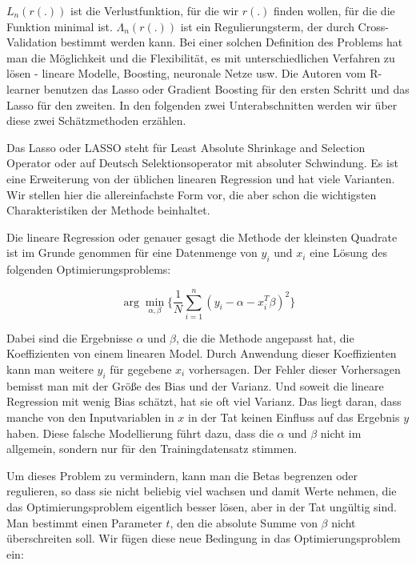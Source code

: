 \documentclass[12pt,a4paper,twoside]{scrartcl}
\numberwithin{equation}{section}
\newcounter{subsubsubsection}[subsubsection]
\begin{document}
\noindent
$L_n(r(.))$ ist die Verlustfunktion, für die wir $r(.)$ finden wollen, für die die Funktion minimal ist. $\Lambda_n(r(.))$ ist ein Regulierungsterm, der durch Cross-Validation bestimmt werden kann. Bei einer solchen Definition des Problems hat man die Möglichkeit und die Flexibilität, es mit unterschiedlichen Verfahren zu lösen - lineare Modelle, Boosting, neuronale Netze usw. Die Autoren vom R-learner benutzen das Lasso oder Gradient Boosting für den ersten Schritt und das Lasso für den zweiten. In den folgenden zwei Unterabschnitten werden wir über diese zwei Schätzmethoden erzählen.\par

\label{subsubsubsec:lasso}
	Das Lasso oder LASSO steht für Least Absolute Shrinkage and Selection Operator oder auf Deutsch Selektionsoperator mit absoluter Schwindung. Es ist eine Erweiterung von der üblichen linearen Regression und hat viele Varianten. Wir stellen hier die allereinfachste Form vor, die aber schon die wichtigsten Charakteristiken der Methode beinhaltet.\par 
	
\noindent
Die lineare Regression oder genauer gesagt die Methode der kleinsten Quadrate ist im Grunde genommen für eine Datenmenge von  $y_i$ und $x_i$ eine Lösung des folgenden Optimierungsproblems:\par	

\begin{equation}\label{eq:2.22}
	 \arg\min_{\alpha, \beta} \bigg\{ \frac{1}{N}\sum_{i=1}^{n} (y_i - \alpha - x_i^T\beta)^2 \bigg\}
\end{equation}

\noindent
Dabei sind die Ergebnisse $\alpha$ und $\beta$, die die Methode angepasst hat, die Koeffizienten von einem linearen Model. Durch Anwendung dieser Koeffizienten kann man weitere $y_i$ für gegebene $x_i$ vorhersagen. Der Fehler dieser Vorhersagen bemisst man mit der Größe des Bias und der Varianz. Und soweit die lineare Regression mit wenig Bias schätzt, hat sie oft viel Varianz. Das liegt daran, dass manche von den Inputvariablen in $x$ in der Tat keinen Einfluss auf das Ergebnis $y$ haben. Diese falsche Modellierung führt dazu, dass die $\alpha$ und $\beta$ nicht im allgemein, sondern nur für den Trainingdatensatz stimmen.\par 

\noindent
Um dieses Problem zu vermindern, kann man die Betas begrenzen oder regulieren, so dass sie nicht beliebig viel wachsen und damit Werte nehmen, die das Optimierungsproblem eigentlich besser lösen, aber in der Tat ungültig sind. Man bestimmt einen Parameter $t$, den die absolute Summe von $\beta$ nicht überschreiten soll\cite{tibshirani1996regression}. Wir fügen diese neue Bedingung in das Optimierungsproblem ein:\par   
\end{document}
